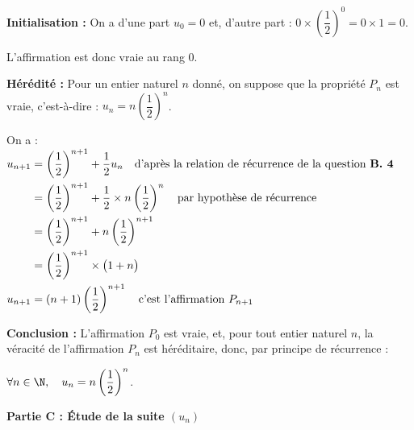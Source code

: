 \begin{enumerate}
\textbf{Initialisation :} On a d'une part $u_0 = 0$ et, d'autre part : $0\times\left(\dfrac{1}{2}\right)^0 = 0\times 1 = 0 $.

L'affirmation est donc vraie au rang 0.

\textbf{Hérédité :} Pour un entier naturel $n$ donné, on suppose que la propriété $P_n$ est vraie, c'est-à-dire : $u_n = n\left(\dfrac{1}{2}\right)^n$.

On a : \quad
$\begin{aligned}[t]
u_{n+1} &= \left(\dfrac{1}{2}\right)^{n+1} + \dfrac{1}{2}u_n \quad \text{d'après la relation de récurrence de la question \textbf{B. 4}}\\
	& = \left(\dfrac{1}{2}\right)^{n+1} + \dfrac{1}{2}\times n\left(\dfrac{1}{2}\right)^{n}\quad\text{par hypothèse de récurrence}\\
	& = \left(\dfrac{1}{2}\right)^{n+1} + n\left(\dfrac{1}{2}\right)^{n+1}\\
	& = \left(\dfrac{1}{2}\right)^{n+1}\times\big(1 +n\big)\\
	u_{n+1}&=(n+1)\left(\dfrac{1}{2}\right)^{n+1} \quad \text{c'est l'affirmation }P_{n+1}
\end{aligned}$

\textbf{Conclusion :} L'affirmation $P_0$ est vraie, et, pour tout entier naturel $n$, la véracité de l'affirmation $P_n$ est héréditaire, donc, par principe de récurrence :

$\forall n \in \N,\quad u_n = n\left(\dfrac{1}{2}\right) ^{n}$.
\end{enumerate}

\medskip

\textbf{Partie C : Étude de la suite \boldmath$(u_{n})$\unboldmath}

\medskip

